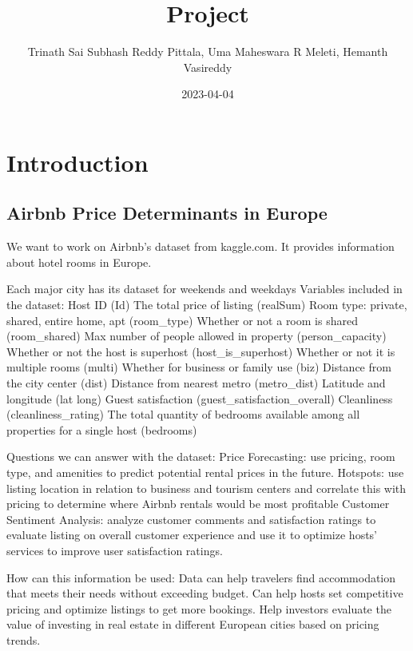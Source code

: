 \documentclass[
]{article}
\title{Project}
\author{Trinath Sai Subhash Reddy Pittala, Uma Maheswara R Meleti,
Hemanth Vasireddy}
\date{2023-04-04}
\begin{document}
\maketitle

\hypertarget{introduction}{%
\section{Introduction}\label{introduction}}

\hypertarget{airbnb-price-determinants-in-europe}{%
\subsection{Airbnb Price Determinants in
Europe}\label{airbnb-price-determinants-in-europe}}

We want to work on Airbnb's dataset from kaggle.com. It provides
information about hotel rooms in Europe.

Each major city has its dataset for weekends and weekdays Variables
included in the dataset: Host ID (Id) The total price of listing
(realSum) Room type: private, shared, entire home, apt (room\_type)
Whether or not a room is shared (room\_shared) Max number of people
allowed in property (person\_capacity) Whether or not the host is
superhost (host\_is\_superhost) Whether or not it is multiple rooms
(multi) Whether for business or family use (biz) Distance from the city
center (dist) Distance from nearest metro (metro\_dist) Latitude and
longitude (lat long) Guest satisfaction (guest\_satisfaction\_overall)
Cleanliness (cleanliness\_rating) The total quantity of bedrooms
available among all properties for a single host (bedrooms)

Questions we can answer with the dataset: Price Forecasting: use
pricing, room type, and amenities to predict potential rental prices in
the future. Hotspots: use listing location in relation to business and
tourism centers and correlate this with pricing to determine where
Airbnb rentals would be most profitable Customer Sentiment Analysis:
analyze customer comments and satisfaction ratings to evaluate listing
on overall customer experience and use it to optimize hosts' services to
improve user satisfaction ratings.

How can this information be used: Data can help travelers find
accommodation that meets their needs without exceeding budget. Can help
hosts set competitive pricing and optimize listings to get more
bookings. Help investors evaluate the value of investing in real estate
in different European cities based on pricing trends.
\end{document}
